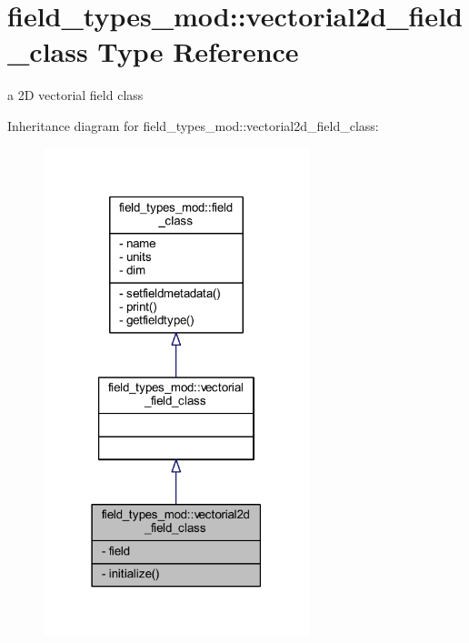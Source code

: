 \hypertarget{structfield__types__mod_1_1vectorial2d__field__class}{}\section{field\+\_\+types\+\_\+mod\+:\+:vectorial2d\+\_\+field\+\_\+class Type Reference}
\label{structfield__types__mod_1_1vectorial2d__field__class}


a 2D vectorial field class  




Inheritance diagram for field\+\_\+types\+\_\+mod\+:\+:vectorial2d\+\_\+field\+\_\+class\+:
\nopagebreak
\begin{figure}[H]
\begin{center}
\leavevmode
\includegraphics[width=219pt]{structfield__types__mod_1_1vectorial2d__field__class__inherit__graph}
\end{center}
\end{figure}


